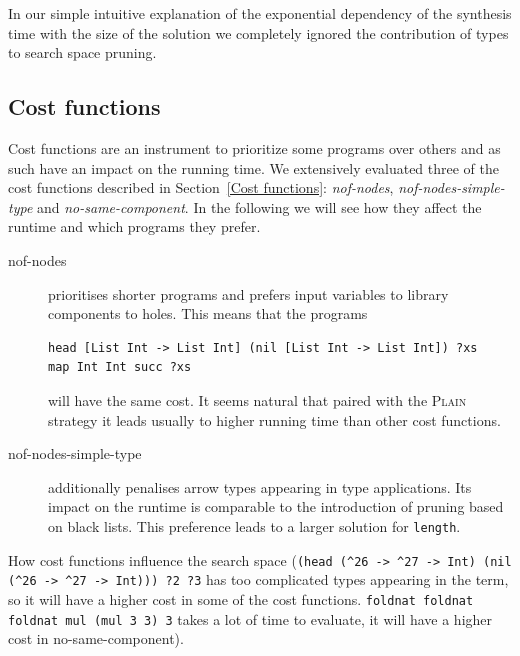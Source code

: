 In our simple intuitive explanation of the exponential dependency of the synthesis time with the size of the solution we completely ignored the contribution of types to search space pruning.

\subsection{Cost functions}
Cost functions are an instrument to prioritize some programs over others and as such have an impact on the running time. We extensively evaluated three of the cost functions described in Section~\ref{Cost functions}: \textit{nof-nodes}, \textit{nof-nodes-simple-type} and \textit{no-same-component}. In the following we will see how they affect the runtime and which programs they prefer.

\begin{description}
\item[nof-nodes] prioritises shorter programs and prefers input variables to library components to holes. This means that the programs
\begin{lstlisting}[style=plain]
head [List Int -> List Int] (nil [List Int -> List Int]) ?xs
map Int Int succ ?xs
\end{lstlisting}
will have the same cost. It seems natural that paired with the \textsc{Plain} strategy it leads usually to higher running time than other cost functions.

\item[nof-nodes-simple-type] additionally penalises arrow types appearing in type applications. Its impact on the runtime is comparable to the introduction of pruning based on black lists. This preference leads to a larger solution for \lstinline!length!.
\end{description}


How cost functions influence the search space (\lstinline!(head (^26 -> ^27 -> Int) (nil (^26 -> ^27 -> Int))) ?2 ?3! has too complicated types appearing in the term, so it will have a higher cost in some of the cost functions. \lstinline!foldnat foldnat foldnat mul (mul 3 3) 3! takes a lot of time to evaluate, it will have a higher cost in no-same-component).

